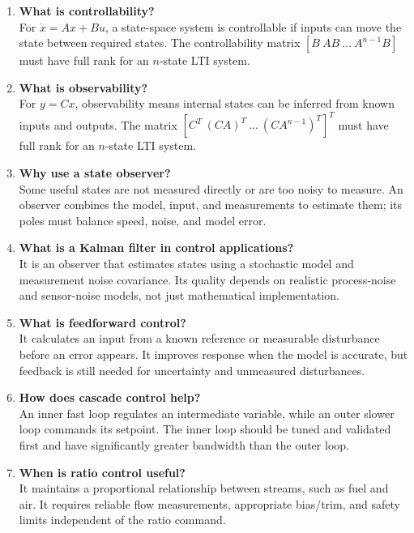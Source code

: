 \documentclass[11pt]{article}
\begin{document}
\begin{enumerate}
\item \textbf{What is controllability?}\\
For $\dot{x}=Ax+Bu$, a state-space system is controllable if inputs can move the state between required states. The controllability matrix $[B\ AB\ \ldots\ A^{n-1}B]$ must have full rank for an $n$-state LTI system.

\item \textbf{What is observability?}\\
For $y=Cx$, observability means internal states can be inferred from known inputs and outputs. The matrix $[C^T\ (CA)^T\ \ldots\ (CA^{n-1})^T]^T$ must have full rank for an $n$-state LTI system.

\item \textbf{Why use a state observer?}\\
Some useful states are not measured directly or are too noisy to measure. An observer combines the model, input, and measurements to estimate them; its poles must balance speed, noise, and model error.

\item \textbf{What is a Kalman filter in control applications?}\\
It is an observer that estimates states using a stochastic model and measurement noise covariance. Its quality depends on realistic process-noise and sensor-noise models, not just mathematical implementation.

\item \textbf{What is feedforward control?}\\
It calculates an input from a known reference or measurable disturbance before an error appears. It improves response when the model is accurate, but feedback is still needed for uncertainty and unmeasured disturbances.

\item \textbf{How does cascade control help?}\\
An inner fast loop regulates an intermediate variable, while an outer slower loop commands its setpoint. The inner loop should be tuned and validated first and have significantly greater bandwidth than the outer loop.

\item \textbf{When is ratio control useful?}\\
It maintains a proportional relationship between streams, such as fuel and air. It requires reliable flow measurements, appropriate bias/trim, and safety limits independent of the ratio command.


\end{enumerate}
\end{document}
